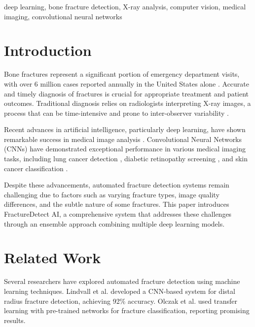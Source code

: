 \documentclass[conference]{IEEEtran}
\begin{document}
\begin{IEEEkeywords}
deep learning, bone fracture detection, X-ray analysis, computer vision, medical imaging, convolutional neural networks
\end{IEEEkeywords}

\section{Introduction}
\label{sec:introduction}

Bone fractures represent a significant portion of emergency department visits, with over 6 million cases reported annually in the United States alone \cite{robbins2019epidemiology}. Accurate and timely diagnosis of fractures is crucial for appropriate treatment and patient outcomes. Traditional diagnosis relies on radiologists interpreting X-ray images, a process that can be time-intensive and prone to inter-observer variability \cite{berlin1993variability}.

Recent advances in artificial intelligence, particularly deep learning, have shown remarkable success in medical image analysis \cite{litjens2017survey}. Convolutional Neural Networks (CNNs) have demonstrated exceptional performance in various medical imaging tasks, including lung cancer detection \cite{ardila2019population}, diabetic retinopathy screening \cite{gulshan2016development}, and skin cancer classification \cite{esteva2017dermatologist}.

Despite these advancements, automated fracture detection systems remain challenging due to factors such as varying fracture types, image quality differences, and the subtle nature of some fractures. This paper introduces FractureDetect AI, a comprehensive system that addresses these challenges through an ensemble approach combining multiple deep learning models.

\section{Related Work}
\label{sec:related_work}

Several researchers have explored automated fracture detection using machine learning techniques. Lindvall et al. \cite{lindvall2018deep} developed a CNN-based system for distal radius fracture detection, achieving 92\% accuracy. Olczak et al. \cite{olczak2017machine} used transfer learning with pre-trained networks for fracture classification, reporting promising results.
\end{document}

